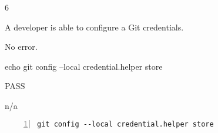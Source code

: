 \begin{description}[align=right,leftmargin=3.2cm,labelindent=3.0cm]
\item[Step:] 6
\item[Confirm:] A developer is able to configure a Git credentials.
\item[Expectation:] No error.
\item[Command:] echo git  config --local credential.helper store
\item[Test Result:] PASS
\item[Evidence:] n/a
\end{description}
\begin{lstlisting}[numbers=left]
git config --local credential.helper store

\end{lstlisting}
